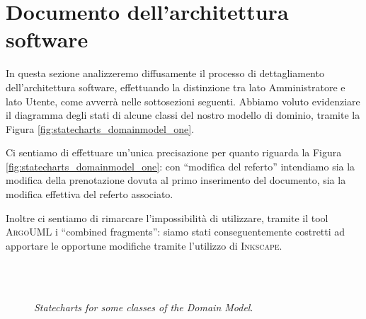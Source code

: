 \section{Documento dell'architettura software}\label{sec:docarchsoft}
In questa sezione analizzeremo diffusamente il processo di dettagliamento dell'architettura
software, effettuando la distinzione tra lato Amministratore e lato Utente, come
avverrà nelle sottosezioni seguenti. Abbiamo voluto evidenziare il diagramma
degli stati di alcune classi del nostro modello di dominio, tramite la 
Figura \vref{fig:statecharts_domainmodel_one}.

Ci sentiamo di effettuare un'unica precisazione per quanto riguarda la
Figura \vref{fig:statecharts_domainmodel_one}:
con ``modifica del referto'' intendiamo sia la modifica della prenotazione 
dovuta al primo inserimento del documento, sia la modifica effettiva del
referto associato.

Inoltre ci sentiamo di rimarcare l'impossibilità di utilizzare, tramite il
tool \textsc{ArgoUML} i ``combined fragments'': siamo stati conseguentemente
costretti ad apportare le opportune modifiche tramite l'utilizzo di \textsc{Inkscape}.

\begin{figure}[t]
 \centering 
   \\
   \\
 \caption{\emph{Statecharts for some classes of the Domain Model}.}
 \label{fig:statecharts_domainmodel_one}
\end{figure}


